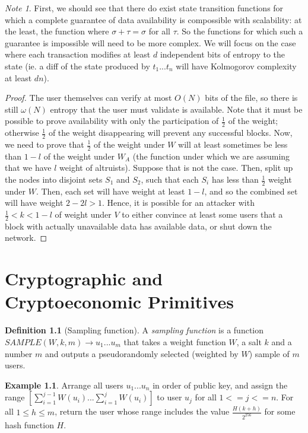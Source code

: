 \documentclass[11pt,a4paper]{report}
\theoremstyle{plain}
\theoremstyle{definition}
\newtheorem{defn}{Definition}[chapter]
\newtheorem{exmp}{Example}[section]
\theoremstyle{remark}
\newtheorem*{note}{Note}
\begin{document}
\begin{note}
First, we should see that there do exist state transition functions for which a complete guarantee of data availability is compossible with scalability: at the least, the function where $\sigma + \tau = \sigma$ for all $\tau$. So the functions for which such a guarantee is impossible will need to be more complex. We will focus on the case where each transaction modifies at least $d$ independent bits of entropy to the state (ie. a diff of the state produced by $t_1 ... t_n$ will have Kolmogorov complexity at least $dn$).
\end{note}

\begin{proof}
The user themselves can verify at most $O(N)$ bits of the file, so there is still $\omega(N)$ entropy that the user must validate is available. Note that it must be possible to prove availability with only the participation of $\frac{1}{2}$ of the weight; otherwise $\frac{1}{2}$ of the weight disappearing will prevent any successful blocks. Now, we need to prove that $\frac{1}{2}$ of the weight under $W$ will at least sometimes be less than $1 - l$ of the weight under $W_A$ (the function under which we are assuming that we have $l$ weight of altruists). Suppose that is not the case. Then, split up the nodes into disjoint sets $S_1$ and $S_2$, such that each $S_i$ has less than $\frac{1}{2}$ weight under $W$. Then, each set will have weight at least $1 - l$, and so the combined set will have weight $2 - 2l > 1$. Hence, it is possible for an attacker with $\frac{1}{2} < k < 1 - l$ of weight under $V$ to either convince at least some users that a block with actually unavailable data has available data, or shut down the network.
\end{proof}

\chapter{Cryptographic and Cryptoeconomic Primitives}

\begin{defn}[Sampling function]
A \emph{sampling function} is a function $SAMPLE(W, k, m) \rightarrow {u_1 ... u_m}$ that takes a weight function $W$, a salt $k$ and a number $m$ and outputs a pseudorandomly selected (weighted by $W$) sample of $m$ users.
\end{defn}

\begin{exmp}
Arrange all users $u_1 ... u_n$ in order of public key, and assign the range $[\sum_{i=1}^{j-1} W(u_i)...\sum_{i=1}^j W(u_i)]$ to user $u_j$ for all $1 <= j <= n$. For all $1 \le h \le m$, return the user whose range includes the value $\frac{H(k + h)}{2^{256}}$ for some hash function $H$.
\end{exmp}
\end{document}
